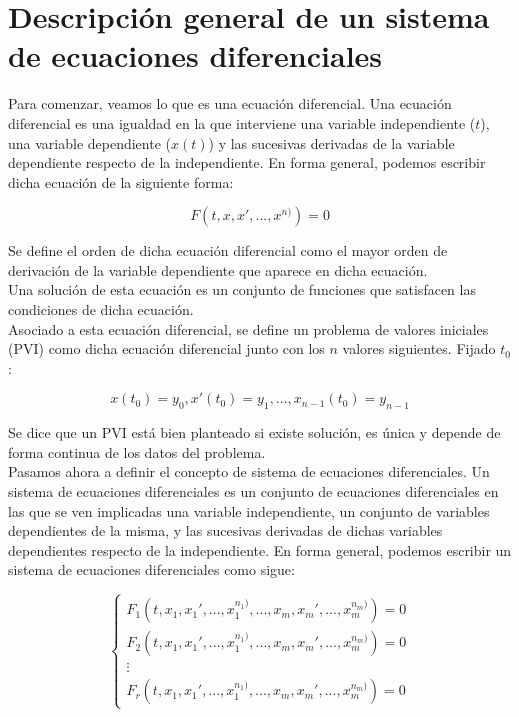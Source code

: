 \documentclass[12pt]{article}       %
\begin{document}
\section{Descripción general de un sistema de ecuaciones diferenciales}

Para comenzar, veamos lo que es una ecuación diferencial. Una ecuación diferencial es una igualdad en la que interviene una variable independiente ($t$), una variable dependiente ($x(t)$) y las sucesivas derivadas de la variable dependiente respecto de la independiente. En forma general, podemos escribir dicha ecuación de la siguiente forma:

$$ F(t, x, x', ..., x^{n)}) = 0 $$

Se define el orden de dicha ecuación diferencial como el mayor orden de derivación de la variable dependiente que aparece en dicha ecuación.\\

Una solución de esta ecuación es un conjunto de funciones que satisfacen las condiciones de dicha ecuación.\\

Asociado a esta ecuación diferencial, se define un problema de valores iniciales (PVI) como dicha ecuación diferencial junto con los $n$ valores siguientes. Fijado $t_0$:

$$ x(t_0) = y_0, x'(t_0) = y_1, ..., x_{n-1}(t_0) = y_{n-1} $$

Se dice que un PVI está bien planteado si existe solución, es única y depende de forma continua de los datos del problema.\\

Pasamos ahora a definir el concepto de sistema de ecuaciones diferenciales. Un sistema de ecuaciones diferenciales es un conjunto de ecuaciones diferenciales en las que se ven implicadas una variable independiente, un conjunto de variables dependientes de la misma, y las sucesivas derivadas de dichas variables dependientes respecto de la independiente. En forma general, podemos escribir un sistema de ecuaciones diferenciales como sigue:

$$
\begin{cases}
F_1(t, x_1, x_1', ..., x_1^{n_1)}, ..., x_m, x_m', ..., x_m^{n_m)}) = 0 \\
F_2(t, x_1, x_1', ..., x_1^{n_1)}, ..., x_m, x_m', ..., x_m^{n_m)}) = 0 \\
\vdots \\
F_r(t, x_1, x_1', ..., x_1^{n_1)}, ..., x_m, x_m', ..., x_m^{n_m)}) = 0
\end{cases}
$$
\end{document}

